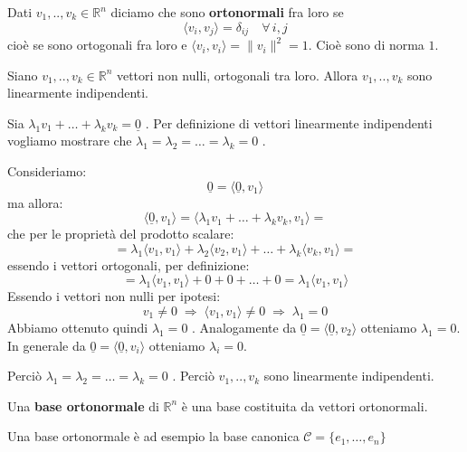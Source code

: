 \documentclass[
  a4paper,
]{article}
\begin{document}
\begin{definitionbox}
Dati \(v_1, .., v_k \in \mathbb{R}^n\) diciamo che sono
\textbf{ortonormali} fra loro se \[
\langle v_i, v_j \rangle = \delta_{ij} \quad \forall\, i, j
\] cioè se sono ortogonali fra loro e
\(\langle v_i, v_i \rangle = \lVert v_i \rVert^2 = 1\). Cioè sono di
norma \(1\).
\end{definitionbox}

\begin{propositionbox}
Siano \(v_1, .., v_k \in \mathbb{R}^n\) vettori non nulli, ortogonali
tra loro. Allora \(v_1, .., v_k\) sono linearmente indipendenti.
\end{propositionbox}

\begin{proofbox}
Sia \(\lambda_1v_1+\dots + \lambda_k v_k = \underline{0}\) . Per
definizione di vettori linearmente indipendenti vogliamo mostrare che
\(\lambda_1 = \lambda_2 = \dots = \lambda_k = 0\) .

Consideriamo: \[
\underline{0} = \langle \underline{0}, v_1 \rangle
\] ma allora: \[
\langle \underline{0}, v_1 \rangle = \langle \lambda_1v_1+\dots + \lambda_k v_k, v_1 \rangle = 
\] che per le proprietà del prodotto scalare: \[
= \lambda_1 \langle v_1, v_1 \rangle + \lambda_2 \langle v_2, v_1 \rangle + \dots + \lambda_k \langle v_k, v_1 \rangle =
\] essendo i vettori ortogonali, per definizione: \[
= \lambda_1 \langle v_1, v_1 \rangle + 0 + 0 + \dots + 0 = \lambda_1 \langle v_1, v_1 \rangle
\] Essendo i vettori non nulli per ipotesi: \[
v_1 \neq 0 \;\Longrightarrow\; \langle v_1, v_1 \rangle \neq 0 \;\Longrightarrow\; \lambda_1 = 0
\] Abbiamo ottenuto quindi \(\lambda_1 = 0\) . Analogamente da
\(\underline{0} = \langle \underline{0}, v_2 \rangle\) otteniamo
\(\lambda_1 = 0\). In generale da
\(\underline{0} = \langle \underline{0}, v_i \rangle\) otteniamo
\(\lambda_i = 0\).

Perciò \(\lambda_1 = \lambda_2 = \dots = \lambda_k = 0\) . Perciò
\(v_1, .., v_k\) sono linearmente indipendenti.
\end{proofbox}

\begin{definitionbox}
Una \textbf{base ortonormale} di \(\mathbb{R}^n\) è una base costituita
da vettori ortonormali.
\end{definitionbox}

\begin{examplebox}
Una base ortonormale è ad esempio la base canonica
\(\mathcal{C} = \{e_1, \dots, e_n \}\)
\end{examplebox}
\end{document}
